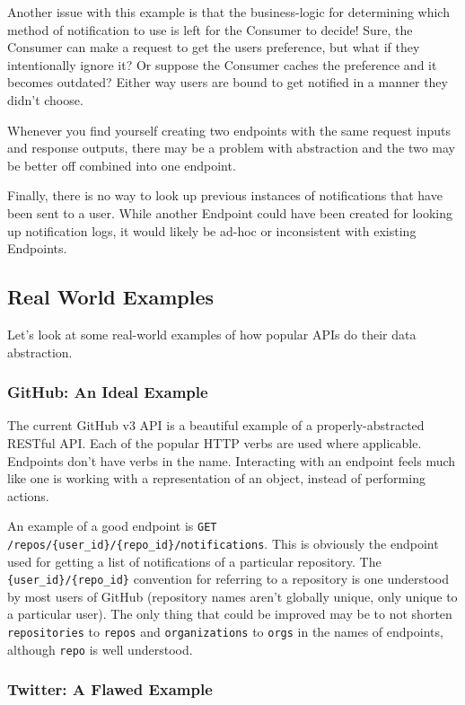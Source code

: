 \documentclass{book}
\begin{document}
Another issue with this example is that the business-logic for determining which method of notification to use is left for the Consumer to decide! Sure, the Consumer can make a request to get the users preference, but what if they intentionally ignore it? Or suppose the Consumer caches the preference and it becomes outdated? Either way users are bound to get notified in a manner they didn't choose.

Whenever you find yourself creating two endpoints with the same request inputs and response outputs, there may be a problem with abstraction and the two may be better off combined into one endpoint.

Finally, there is no way to look up previous instances of notifications that have been sent to a user. While another Endpoint could have been created for looking up notification logs, it would likely be ad-hoc or inconsistent with existing Endpoints.

\subsection{Real World Examples}

Let's look at some real-world examples of how popular APIs do their data abstraction.

\subsubsection{GitHub: An Ideal Example}

The current GitHub v3 API \cite{GITHUBAPI} is a beautiful example of a properly-abstracted RESTful API. Each of the popular HTTP verbs are used where applicable. Endpoints don't have verbs in the name. Interacting with an endpoint feels much like one is working with a representation of an object, instead of performing actions.

An example of a good endpoint is \texttt{GET /repos/\{user\_id\}/\{repo\_id\}/notifications}. This is obviously the endpoint used for getting a list of notifications of a particular repository. The \texttt{\{user\_id\}/\{repo\_id\}} convention for referring to a repository is one understood by most users of GitHub (repository names aren't globally unique, only unique to a particular user). The only thing that could be improved may be to not shorten \texttt{repositories} to \texttt{repos} and \texttt{organizations} to \texttt{orgs} in the names of endpoints, although \texttt{repo} is well understood.

\subsubsection{Twitter: A Flawed Example}
\end{document}
